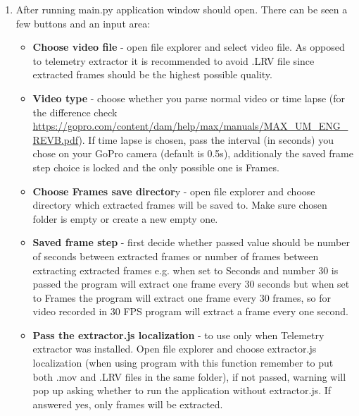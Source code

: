 \documentclass[a4paper,12pt]{book}
\begin{document}
\begin{enumerate}
	\item \begin{minipage}[t]{\linewidth}
		\raggedright
		\medskip	
	\end{minipage}
	After running main.py application window should open.
	There can be seen a few buttons and an input area:
	\begin{itemize}
		\item \textbf{Choose video file} - open file explorer and select video file. As opposed to telemetry extractor it is recommended to avoid .LRV file since extracted frames should be the highest possible quality.
		\item \textbf{Video type} - choose whether you parse normal video or time lapse (for the difference check \url{https://gopro.com/content/dam/help/max/manuals/MAX_UM_ENG_REVB.pdf}). If time lapse is chosen, pass the interval (in seconds) you chose on your GoPro camera (default is 0.5s), additionaly the saved frame step choice is locked and the only possible one is Frames.
		\item \textbf{Choose Frames save director}y - open file explorer and choose directory which extracted frames will be saved to. Make sure chosen folder is empty or create a new empty one.
		\item \textbf{Saved frame step} - first decide whether passed value should be number of seconds between extracted frames or number of frames between extracting extracted frames  e.g. when set to Seconds and number 30 is passed the program will extract one frame every 30 seconds but when set to Frames the program will extract one frame every 30 frames, so for video recorded in 30 FPS program will extract a frame every one second.
		\item \textbf{Pass the extractor.js localization} - to use only when Telemetry extractor was installed. Open file explorer and choose extractor.js localization (when using program with this function remember to put both .mov and .LRV files in the same folder), if not passed,  warning will pop up asking whether to run the application without extractor.js. If answered yes, only frames will be extracted.

\end{itemize}
\end{enumerate}
\end{document}
